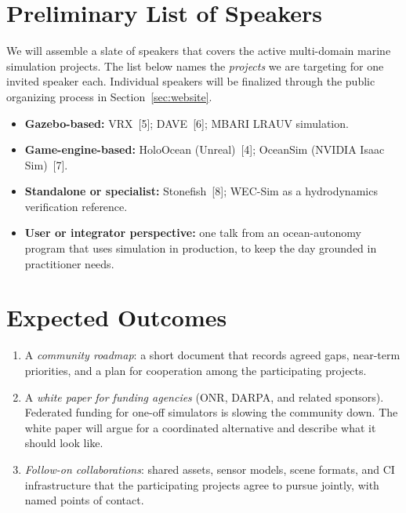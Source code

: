 \documentclass[10pt]{article}
\begin{document}
\section{Preliminary List of Speakers}\label{sec:speakers}

We will assemble a slate of speakers that covers the active multi-domain marine simulation projects. The list below names the \emph{projects} we are targeting for one invited speaker each. Individual speakers will be finalized through the public organizing process in Section~\ref{sec:website}.

\begin{itemize}
  \item \textbf{Gazebo-based:} VRX~[5]; DAVE~[6]; MBARI LRAUV simulation.
  \item \textbf{Game-engine-based:} HoloOcean (Unreal)~[4]; OceanSim (NVIDIA Isaac Sim)~[7].
  \item \textbf{Standalone or specialist:} Stonefish~[8]; WEC-Sim as a hydrodynamics verification reference.
  \item \textbf{User or integrator perspective:} one talk from an ocean-autonomy program that uses simulation in production, to keep the day grounded in practitioner needs.
\end{itemize}


\section{Expected Outcomes}

\begin{enumerate}[label=(\arabic*)]
  \item A \emph{community roadmap}: a short document that records agreed gaps, near-term priorities, and a plan for cooperation among the participating projects.
  \item A \emph{white paper for funding agencies} (ONR, DARPA, and related sponsors). Federated funding for one-off simulators is slowing the community down. The white paper will argue for a coordinated alternative and describe what it should look like.
  \item \emph{Follow-on collaborations}: shared assets, sensor models, scene formats, and CI infrastructure that the participating projects agree to pursue jointly, with named points of contact.
\end{enumerate}
\end{document}
